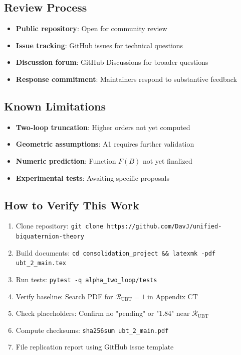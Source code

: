 \subsection*{Review Process}

\begin{itemize}
\item[\checkmark] \textbf{Public repository}: Open for community review
\item[\checkmark] \textbf{Issue tracking}: GitHub issues for technical questions
\item[\checkmark] \textbf{Discussion forum}: GitHub Discussions for broader questions
\item[\checkmark] \textbf{Response commitment}: Maintainers respond to substantive feedback
\end{itemize}

\subsection*{Known Limitations}

\begin{itemize}
\item[\checkmark] \textbf{Two-loop truncation}: Higher orders not yet computed
\item[\checkmark] \textbf{Geometric assumptions}: A1 requires further validation
\item[\checkmark] \textbf{Numeric prediction}: Function $F(B)$ not yet finalized
\item[\checkmark] \textbf{Experimental tests}: Awaiting specific proposals
\end{itemize}

\subsection*{How to Verify This Work}

\begin{enumerate}
\item Clone repository: \texttt{git clone https://github.com/DavJ/unified-biquaternion-theory}
\item Build documents: \texttt{cd consolidation\_project \&\& latexmk -pdf ubt\_2\_main.tex}
\item Run tests: \texttt{pytest -q alpha\_two\_loop/tests}
\item Verify baseline: Search PDF for $\mathcal{R}_{\mathrm{UBT}} = 1$ in Appendix CT
\item Check placeholders: Confirm no "pending" or "1.84" near $\mathcal{R}_{\mathrm{UBT}}$
\item Compute checksums: \texttt{sha256sum ubt\_2\_main.pdf}
\item File replication report using GitHub issue template
\end{enumerate}

